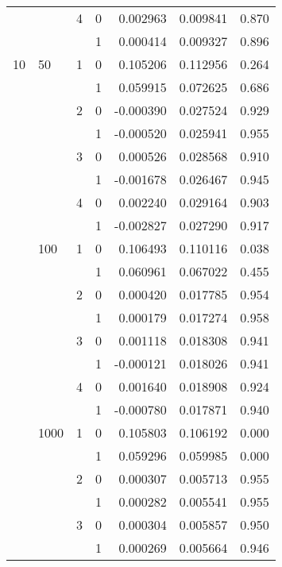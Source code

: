 \begin{tabular}{llllrrr}
   &      & 4 & 0 &  0.002963 &  0.009841 &                 0.870 \\
   &      &   & 1 &  0.000414 &  0.009327 &                 0.896 \\
10 & 50   & 1 & 0 &  0.105206 &  0.112956 &                 0.264 \\
   &      &   & 1 &  0.059915 &  0.072625 &                 0.686 \\
   &      & 2 & 0 & -0.000390 &  0.027524 &                 0.929 \\
   &      &   & 1 & -0.000520 &  0.025941 &                 0.955 \\
   &      & 3 & 0 &  0.000526 &  0.028568 &                 0.910 \\
   &      &   & 1 & -0.001678 &  0.026467 &                 0.945 \\
   &      & 4 & 0 &  0.002240 &  0.029164 &                 0.903 \\
   &      &   & 1 & -0.002827 &  0.027290 &                 0.917 \\
   & 100  & 1 & 0 &  0.106493 &  0.110116 &                 0.038 \\
   &      &   & 1 &  0.060961 &  0.067022 &                 0.455 \\
   &      & 2 & 0 &  0.000420 &  0.017785 &                 0.954 \\
   &      &   & 1 &  0.000179 &  0.017274 &                 0.958 \\
   &      & 3 & 0 &  0.001118 &  0.018308 &                 0.941 \\
   &      &   & 1 & -0.000121 &  0.018026 &                 0.941 \\
   &      & 4 & 0 &  0.001640 &  0.018908 &                 0.924 \\
   &      &   & 1 & -0.000780 &  0.017871 &                 0.940 \\
   & 1000 & 1 & 0 &  0.105803 &  0.106192 &                 0.000 \\
   &      &   & 1 &  0.059296 &  0.059985 &                 0.000 \\
   &      & 2 & 0 &  0.000307 &  0.005713 &                 0.955 \\
   &      &   & 1 &  0.000282 &  0.005541 &                 0.955 \\
   &      & 3 & 0 &  0.000304 &  0.005857 &                 0.950 \\
   &      &   & 1 &  0.000269 &  0.005664 &                 0.946 \\

\end{tabular}
